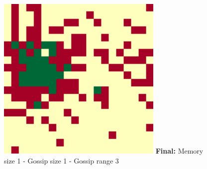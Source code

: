 \documentclass[runningheads]{llncs}
\begin{document}
\begin{figure}[!hb]
{    \includegraphics[width=\textwidth/4]{spatial-memory0+gossip0+range0-C.pdf}
  }
  \textbf{Final:} Memory size 1 - Gossip size 1 - Gossip range 3
\end{figure}
\end{document}
